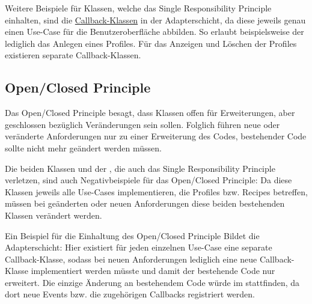 Weitere Beispiele für Klassen, welche das Single Responsibility Principle einhalten, sind die \href{https://github.com/anditru/quickie/tree/bb41442c7f1ffbfcd3117cd86a40f7932e543a33/1-quickie-adapters/src/main/java/org/pinkcrazyunicorn/quickie/adapters/callbacks}{Callback-Klassen} in der Adapterschicht, da diese jeweils genau einen Use-Case für die Benutzeroberfläche abbilden. So erlaubt beispielsweise der \href{https://github.com/anditru/quickie/blob/bb41442c7f1ffbfcd3117cd86a40f7932e543a33/1-quickie-adapters/src/main/java/org/pinkcrazyunicorn/quickie/adapters/callbacks/profile/AddProfileCallback.java}{} lediglich das Anlegen eines Profiles. Für das Anzeigen und Löschen der Profiles existieren separate Callback-Klassen.

\subsection{Open/Closed Principle}
Das Open/Closed Principle besagt, dass Klassen offen für Erweiterungen, aber geschlossen bezüglich Veränderungen sein sollen. Folglich führen neue oder veränderte Anforderungen nur zu einer Erweiterung des Codes, bestehender Code sollte nicht mehr geändert werden müssen.

Die beiden Klassen \href{https://github.com/anditru/quickie/blob/bb41442c7f1ffbfcd3117cd86a40f7932e543a33/2-quickie-application/src/main/java/org/pinkcrazyunicorn/quickie/application/profile/ProfileService.java}{} und der \href{https://github.com/anditru/quickie/blob/bb41442c7f1ffbfcd3117cd86a40f7932e543a33/2-quickie-application/src/main/java/org/pinkcrazyunicorn/quickie/application/recipe/RecipeService.java}{}, die auch das Single Responsibility Principle verletzen, sind auch Negativbeispiele für das Open/Closed Principle: Da diese Klassen jeweils alle Use-Cases implementieren, die Profiles bzw. Recipes betreffen, müssen bei geänderten oder neuen Anforderungen diese beiden bestehenden Klassen verändert werden.

Ein Beispiel für die Einhaltung des Open/Closed Principle Bildet die Adapterschicht: Hier existiert für jeden einzelnen Use-Case eine separate Callback-Klasse, sodass bei neuen Anforderungen lediglich eine neue Callback-Klasse implementiert werden müsste und damit der bestehende Code nur erweitert. Die einzige Änderung an bestehendem Code würde im \href{https://github.com/anditru/quickie/blob/bb41442c7f1ffbfcd3117cd86a40f7932e543a33/1-quickie-adapters/src/main/java/org/pinkcrazyunicorn/quickie/adapters/Controller.java}{} stattfinden, da dort neue Events bzw. die zugehörigen Callbacks registriert werden.

